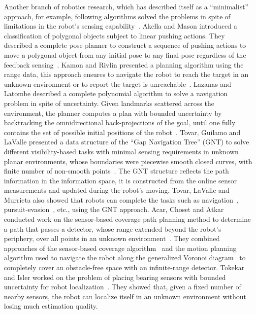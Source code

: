 Another branch of robotics research, which has described itself as a ``minimalist''
approach, for example, following algorithms solved the problems in spite of limitations
in the robot's sensing capability~\cite{AkeMas98,Erd86, %
  KamRiv97, LumTiw94,BluRagSch97,LazLat92, %
  TovGuiLav04, AcaCho01b,ChoBur00}. %
Akella and Mason introduced a classification of polygonal objects subject to
linear pushing actions. They described a complete pose planner to
construct a sequence of pushing actions to move a polygonal object from any
initial pose to any final pose regardless of the feedback sensing~\cite{AkeMas98}. 
%
Kamon and Rivlin presented a planning algorithm using the range data, 
this approach ensures to navigate the robot to reach the target in an unknown environment or to report the target is unreachable~\cite{KamRiv97}. 
%
Lazanas and Latombe described a complete polynomial algorithm to solve a navigation
problem in spite of uncertainty. 
%
Given landmarks scattered across the environment, the planner computes a plan with bounded uncertainty by
backtracking the omnidirectional back-projections of the goal, until one fully
contains the set of possible initial positions of the robot~\cite{LazLat92}.
%
Tovar, Guilamo and LaValle presented a data structure of the ``Gap Navigation Tree''
(GNT) to solve different visibility-based tasks with minimal sensing requirements in unknown planar environments, 
whose boundaries were piecewise smooth closed curves, with finite number of non-smooth points~\cite{TovGuiLav04}. 
The GNT structure reflects the path information in the information space, 
it is constructed from the online sensor measurements and updated during the robot's moving. 
%
Tovar, LaValle and Murrieta also showed that robots can complete the tasks such as navigation~\cite{TovLavMur03b}, pursuit-evasion~\cite{TovLav06}, etc., using the GNT approach.
%
Acar, Choset and Atkar conducted work on the sensor-based coverage path planning method to
determine a path that passes a detector, whose range extended beyond the robot's
periphery, over all points in an unknown environment~\cite{AcaCho01b}. 
%
They combined approaches of the sensor-based coverage algorithm~\cite{AcaCho01a,AcaCho00, ChoAcaRizLun00} and the motion planning algorithm used to navigate the robot along the generalized Voronoi diagram~\cite{ChoKonRiz97, ChoBur00} to completely cover an obstacle-free space with an infinite-range
detector. 
%
Tokekar and Isler worked on the problem of placing bearing sensors with bounded uncertainty for robot localization~\cite{TokIsl13}. 
They showed that, given a fixed number of nearby sensors, the robot can localize itself in an unknown environment without losing much estimation quality.

